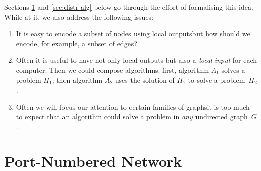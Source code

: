 Sections \ref{sec:pnn} and \ref{sec:distr-alg} below go through the effort of formalising this idea. While at it, we also address the following issues:
\begin{enumerate}
    \item It is easy to encode a subset of nodes using local outputs\mydash but how should we encode, for example, a subset of edges?
    \item Often it is useful to have not only local outputs but also a \emph{local input} for each computer. Then we could compose algorithms: first, algorithm $A_1$ solves a problem $\Pi_1$; then algorithm $A_2$ uses the solution of $\Pi_1$ to solve a problem~$\Pi_2$.
    \item Often we will focus our attention to certain families of graphs\mydash it is too much to expect that an algorithm could solve a problem in \emph{any} undirected graph~$G$.
\end{enumerate}

\section{Port-Numbered Network}\label{sec:pnn}

